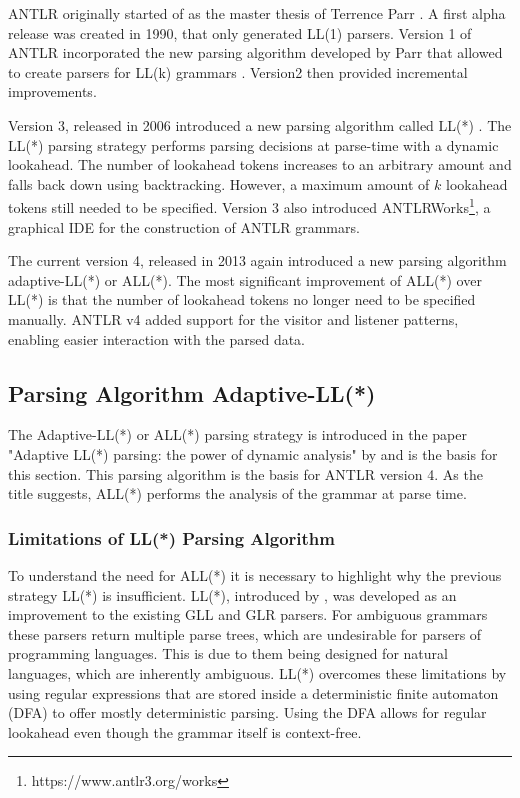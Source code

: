 ANTLR originally started of as the master thesis of Terrence Parr \parencite{PCCTSHistory1994}. A first alpha release was created in 1990, that only generated LL(1) parsers. Version 1 of ANTLR incorporated the new parsing algorithm developed by Parr that allowed to create parsers for LL(k) grammars \parencite{parrPhd1993}. Version2 then provided incremental improvements.   

Version 3, released in 2006 introduced a new parsing algorithm called LL(*) \parencite{LLSParsing2011}. The LL(*) parsing strategy performs parsing decisions at parse-time with a dynamic lookahead. The number of lookahead tokens increases to an arbitrary amount and falls back down using backtracking. However, a maximum amount of $k$ lookahead tokens still needed to be specified. Version 3 also introduced ANTLRWorks\footnote{https://www.antlr3.org/works}, a graphical IDE for the construction of ANTLR grammars.

The current version 4, released in 2013 again introduced a new parsing algorithm adaptive-LL(*) or ALL(*). The most significant improvement of ALL(*) over LL(*) is that the number of lookahead tokens no longer need to be specified manually. ANTLR v4 added support for the visitor and listener patterns, enabling easier interaction with the parsed data. 

\subsection{Parsing Algorithm Adaptive-LL(*)}
\label{sec:allstar}

The Adaptive-LL(*) or ALL(*) parsing strategy is introduced in the paper "Adaptive LL(*) parsing: the power of dynamic analysis" by \textcite{ALLParsing2014} and is the basis for this section. This parsing algorithm is the basis for ANTLR version 4. As the title suggests, ALL(*) performs the analysis of the grammar at parse time. 

\subsubsection{Limitations of LL(*) Parsing Algorithm}

To understand the need for ALL(*) it is necessary to highlight why the previous strategy LL(*) is insufficient. LL(*), introduced by \textcite{parr2011ll}, was developed as an improvement to the existing GLL \parencite{GLL2010} and GLR \parencite{tomita1991generalized} parsers.  For ambiguous grammars these parsers return multiple parse trees, which are undesirable for parsers of programming languages. This is due to them being designed for natural languages, which are inherently ambiguous. LL(*) overcomes these limitations by using regular expressions that are stored inside a deterministic finite automaton (DFA) to offer mostly deterministic parsing. Using the DFA allows for regular lookahead even though the grammar itself is context-free. 

